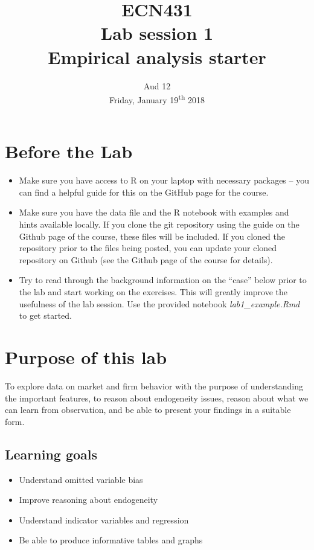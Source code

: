 \documentclass[12pt,a4paper]{article}
\title{ECN431\\Lab session 1\\Empirical analysis starter}
\date{Aud 12 \\ Friday, January 19\textsuperscript{th} 2018}
\begin{document}
\maketitle

\section*{Before the Lab}
\begin{itemize}
\item Make sure you have access to R on your laptop with necessary packages -- you can find a helpful guide for this on the GitHub page for the course.
\item Make sure you have the data file and the R notebook with examples and hints available locally. If you clone the git repository using the guide on the Github page of the course, these files will be included. If you cloned the repository prior to the files being posted, you can update your cloned repository on Github (see the Github page of the course for details).
\item Try to read through the background information on the ``case'' below prior to the lab and start working on the exercises. This will greatly improve the usefulness of the lab session. Use the provided notebook \emph{lab1\_example.Rmd} to get started.
\end{itemize}

\section*{Purpose of this lab}
To explore data on market and firm behavior with the purpose of understanding the important features, to reason about endogeneity issues, reason about what we can learn from observation, and be able to present your findings in a suitable form.

\subsection*{Learning goals}
\begin{itemize}
\item	Understand omitted variable bias
\item	Improve reasoning about endogeneity
\item	Understand indicator variables and regression
\item	Be able to produce informative tables and graphs
\end{itemize}
\end{document}
